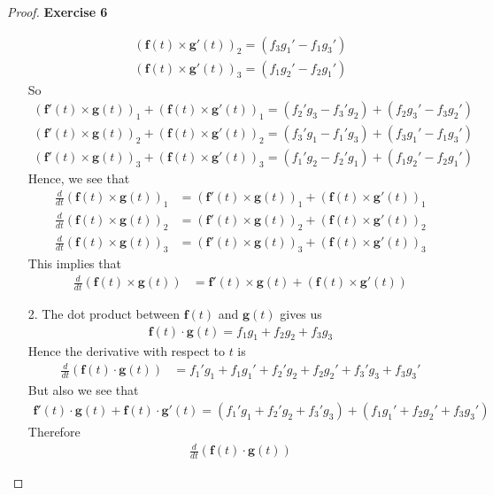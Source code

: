\documentclass[11pt]{article}
\theoremstyle{definition}
\begin{document}
\begin{proof}{\textbf{Exercise 6}}
\begin{itemize}
\begin{align*}
        (\bm{f}(t)\times \bm{g}'(t))_2 = (f_3g_1' - f_1g_3')\\
        (\bm{f}(t)\times \bm{g}'(t))_3 = (f_1g_2' - f_2g_1')
    \end{align*}
    So 
    \begin{align*}
        (\bm{f}'(t)\times \bm{g}(t))_1 + (\bm{f}(t)\times \bm{g}'(t))_1
        = (f_2'g_3 - f_3'g_2) + (f_2g_3' - f_3g_2')\\
        (\bm{f}'(t)\times \bm{g}(t))_2 + (\bm{f}(t)\times \bm{g}'(t))_2
        = (f_3'g_1 - f_1'g_3) + (f_3g_1' - f_1g_3')\\
        (\bm{f}'(t)\times \bm{g}(t))_3 + (\bm{f}(t)\times \bm{g}'(t))_3
        = (f_1'g_2 - f_2'g_1) + (f_1g_2' - f_2g_1')
    \end{align*}
    Hence, we see that
    \begin{align*}
        \frac{d}{dt}(\bm{f}(t) \times \bm{g}(t))_1 &= 
        (\bm{f}'(t)\times \bm{g}(t))_1 + (\bm{f}(t)\times \bm{g}'(t))_1\\
        \frac{d}{dt}(\bm{f}(t) \times \bm{g}(t))_2 &= 
        (\bm{f}'(t)\times \bm{g}(t))_2 + (\bm{f}(t)\times \bm{g}'(t))_2\\
        \frac{d}{dt}(\bm{f}(t) \times \bm{g}(t))_3 &= 
        (\bm{f}'(t)\times \bm{g}(t))_3 + (\bm{f}(t)\times \bm{g}'(t))_3
    \end{align*}
    This implies that
    \begin{align*}
        \frac{d}{dt}(\bm{f}(t) \times \bm{g}(t)) &= 
       \bm{f}'(t)\times \bm{g}(t) + (\bm{f}(t)\times \bm{g}'(t))
    \end{align*}
    \item [2.]
    The dot product between $\bm{f}(t)$ and $\bm{g}(t)$ gives us
    \begin{align*}
        \bm{f}(t) \cdot \bm{g}(t) = f_1g_1 + f_2g_2 + f_3g_3
    \end{align*}
    Hence the derivative with respect to $t$ is
    \begin{align*}
        \frac{d}{dt}(\bm{f}(t) \cdot \bm{g}(t))
        &= f_1'g_1 + f_1g_1' + f_2'g_2 + f_2g_2' + f_3'g_3 + f_3g_3'
    \end{align*}
    But also we see that 
    \begin{align*}
        \bm{f}'(t) \cdot \bm{g}(t) + \bm{f}(t) \cdot \bm{g}'(t)
        = (f_1'g_1 + f_2'g_2 + f_3'g_3) + (f_1g_1' + f_2g_2' + f_3g_3')
    \end{align*}
    Therefore
    \begin{align*}
        \frac{d}{dt}(\bm{f}(t) \cdot \bm{g}(t))

\end{align*}
\end{itemize}
\end{proof}
\end{document}
